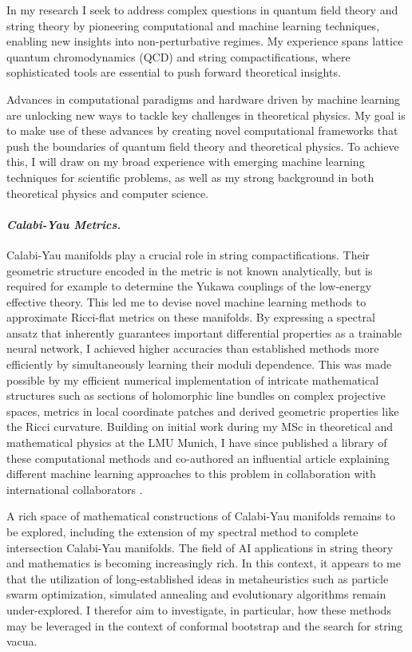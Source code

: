\documentclass[12pt]{article}
\title{}
\author{}
\date{}
\begin{document}
\thispagestyle{firstpagestyle}


In my research I seek to address complex questions in quantum field theory and string theory by pioneering computational and machine learning techniques, enabling new insights into non-perturbative regimes.
My experience spans lattice quantum chromodynamics (QCD) and string compactifications, where sophisticated tools are essential to push forward theoretical insights.

Advances in computational paradigms and hardware driven by machine learning are unlocking new
ways to tackle key challenges in theoretical physics. My goal is to make use of these advances by creating novel computational
frameworks that push the boundaries of quantum field theory and theoretical physics. To achieve
this, I will draw on my broad experience with emerging machine learning techniques for scientific
problems, as well as my strong background in both theoretical physics and computer science.

\paragraph{\textit{{Calabi-Yau Metrics.}}}
Calabi-Yau manifolds play a crucial role in string compactifications.
Their geometric structure encoded in the metric is not known analytically, but is required for example to determine the Yukawa couplings of the low-energy effective theory.
This led me to devise novel machine learning methods to approximate Ricci-flat metrics on these manifolds.
By expressing a spectral ansatz that inherently guarantees important differential properties as a trainable neural network, I achieved higher accuracies than established methods more efficiently by simultaneously learning their moduli dependence.
This was made possible by my efficient numerical implementation of intricate mathematical structures such as sections of holomorphic line bundles on complex projective spaces, metrics in local coordinate patches and derived geometric properties like the Ricci curvature.
Building on initial work during my MSc in theoretical and mathematical physics at the LMU Munich, I have since published a library of these computational methods \cite{gerdes2023CYJAXPackage} and co-authored an influential article explaining different machine learning approaches to this problem in collaboration with international collaborators \cite{anderson2021ModulidependentCalabiYau}.

\textbf{\color{royalblue}{Future Directions.}}
A rich space of mathematical constructions of Calabi-Yau manifolds remains to be explored, including the extension of my spectral method to complete intersection Calabi-Yau manifolds.
The field of AI applications in string theory and mathematics is becoming increasingly rich.
In this context, it appears to me that the utilization of long-established ideas in metaheuristics such as particle swarm optimization, simulated annealing and evolutionary algorithms remain under-explored.
I therefor aim to investigate, in particular, how these methods may be leveraged in the context of conformal bootstrap and the search for string vacua.
\end{document}
